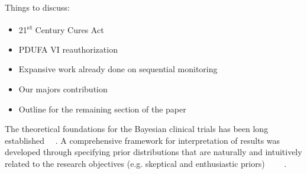 \documentclass[12pt]{article}
\begin{document}
Things to discuss:
\begin{itemize}
 \item 21\textsuperscript{st} Century Cures Act
 \item PDUFA VI reauthorization
 \item Expansive work already done on sequential monitoring
 \item Our majors contribution
 \item Outline for the remaining section of the paper
\end{itemize}

The theoretical foundations for the Bayesian clinical trials has been long established \cite{Cornfield1966}~\cite{Cornfield1966a}~\cite{Neyman1967}. A comprehensive framework for interpretation of results was developed through specifying prior distributions that are naturally and intuitively related to the research objectives (e.g. skeptical and enthusiastic priors) \cite{Freedman1989}~\cite{Freedman1992}~\cite{Spiegelhalter1993}~\cite{Spiegelhalter1994}~\cite{Fayers1997}.
\end{document}
